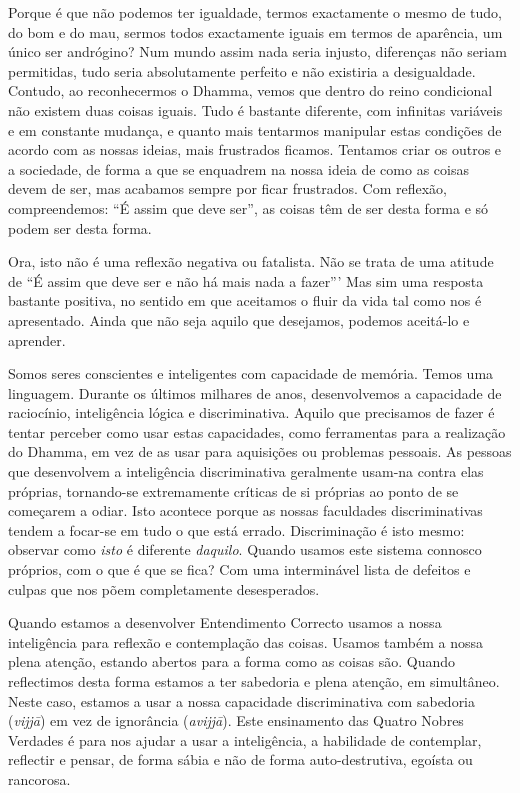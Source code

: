 Porque é que não podemos ter igualdade, termos exactamente o mesmo de tudo, do
bom e do mau, sermos todos exactamente iguais em termos de aparência, um único
ser andrógino? Num mundo assim nada seria injusto, diferenças não seriam
permitidas, tudo seria absolutamente perfeito e não existiria a desigualdade.
Contudo, ao reconhecermos o Dhamma, vemos que dentro do reino condicional não
existem duas coisas iguais. Tudo é bastante diferente, com infinitas variáveis e
em constante mudança, e quanto mais tentarmos manipular estas condições de
acordo com as nossas ideias, mais frustrados ficamos. Tentamos criar os outros e
a sociedade, de forma a que se enquadrem na nossa ideia de como as coisas devem
de ser, mas acabamos sempre por ficar frustrados. Com reflexão, compreendemos:
“É assim que deve ser”, as coisas têm de ser desta forma e só podem ser desta
forma.

Ora, isto não é uma reflexão negativa ou fatalista. Não se trata de uma atitude
de “É assim que deve ser e não há mais nada a fazer”' Mas sim uma resposta
bastante positiva, no sentido em que aceitamos o fluir da vida tal como nos é
apresentado. Ainda que não seja aquilo que desejamos, podemos aceitá-lo e
aprender.

\sectionBreak

Somos seres conscientes e inteligentes com capacidade de memória. Temos uma
linguagem. Durante os últimos milhares de anos, desenvolvemos a capacidade de
raciocínio, inteligência lógica e discriminativa. Aquilo que precisamos de fazer
é tentar perceber como usar estas capacidades, como ferramentas para a
realização do Dhamma, em vez de as usar para aquisições ou problemas pessoais.
As pessoas que desenvolvem a inteligência discriminativa geralmente usam-na
contra elas próprias, tornando-se extremamente críticas de si próprias ao ponto
de se começarem a odiar. Isto acontece porque as nossas faculdades
discriminativas tendem a focar-se em tudo o que está errado. Discriminação é
isto mesmo: observar como \emph{isto} é diferente \emph{daquilo}. Quando usamos
este sistema connosco próprios, com o que é que se fica? Com uma interminável
lista de defeitos e culpas que nos põem completamente desesperados.

Quando estamos a desenvolver Entendimento Correcto usamos a nossa inteligência
para reflexão e contemplação das coisas. Usamos também a nossa plena atenção,
estando abertos para a forma como as coisas são. Quando reflectimos desta forma
estamos a ter sabedoria e plena atenção, em simultâneo. Neste caso, estamos a
usar a nossa capacidade discriminativa com sabedoria (\emph{vijjā}) em vez de
ignorância (\emph{avijjā}). Este ensinamento das Quatro Nobres Verdades é para
nos ajudar a usar a inteligência, a habilidade de contemplar, reflectir e
pensar, de forma sábia e não de forma auto-destrutiva, egoísta ou rancorosa.

